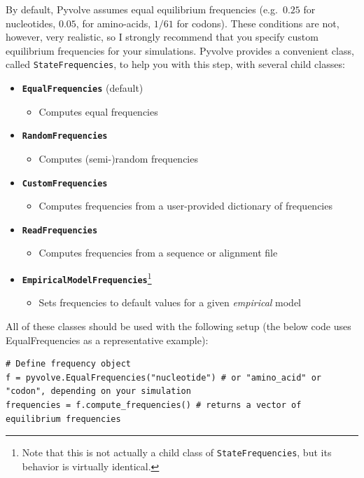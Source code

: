 \documentclass{article}
\newcommand{\code}[1]{\texttt{\small{#1}}}
\begin{document}
By default, Pyvolve assumes equal equilibrium frequencies (e.g.\ $0.25$ for nucleotides, $0.05$, for amino-acids, $1/61$ for codons). These conditions are not, however, very realistic, so I strongly recommend that you specify custom equilibrium frequencies for your simulations. Pyvolve provides a convenient class, called \code{StateFrequencies}, to help you with this step, with several child classes:
\begin{itemize}
	\item \code{\textbf{EqualFrequencies}} (default)
	\begin{itemize}
		\item Computes equal frequencies 
	\end{itemize}
	
	\item \code{\textbf{RandomFrequencies}}
	\begin{itemize}
		\item Computes (semi-)random frequencies
	\end{itemize}
	
	\item \code{\textbf{CustomFrequencies}}
	\begin{itemize}
		\item Computes frequencies from a user-provided dictionary of frequencies
	\end{itemize}
	
	\item \code{\textbf{ReadFrequencies}}
	\begin{itemize}
		\item Computes frequencies from a sequence or alignment file
	\end{itemize}
	
	\item \code{\textbf{EmpiricalModelFrequencies}}\footnote{Note that this is not actually a child class of \code{StateFrequencies}, but its behavior is virtually identical.}
	\begin{itemize}
		\item Sets frequencies to default values for a given \emph{empirical} model		
	\end{itemize}
\end{itemize}


All of these classes should be used with the following setup (the below code uses EqualFrequencies as a representative example):
\begin{lstlisting}
# Define frequency object
f = pyvolve.EqualFrequencies("nucleotide") # or "amino_acid" or "codon", depending on your simulation
frequencies = f.compute_frequencies() # returns a vector of equilibrium frequencies
\end{lstlisting}
\end{document}

